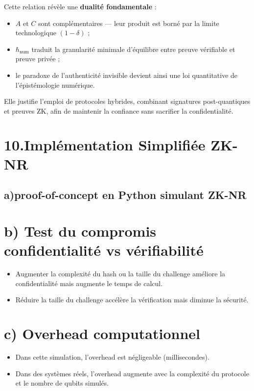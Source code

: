 \documentclass[12pt,a4paper]{report}
\begin{document}
{Cette relation révèle une \textbf{dualité fondamentale} :
\begin{itemize}
  \item $A$ et $C$ sont complémentaires — leur produit est borné par la limite technologique $(1-\delta)$ ;
  \item $\hbar_{\text{num}}$ traduit la granularité minimale d’équilibre entre preuve vérifiable et preuve privée ;
  \item le paradoxe de l’authenticité invisible devient ainsi une loi quantitative de l’épistémologie numérique.
\end{itemize}
Elle justifie l’emploi de protocoles hybrides, combinant signatures post-quantiques et preuves ZK, afin de maintenir la confiance sans sacrifier la confidentialité.


		
	    \section*{10.Implémentation Simplifiée ZK-NR}
		\subsection*{a)proof-of-concept en Python simulant ZK-NR}
	\section*{b) Test du compromis confidentialité vs vérifiabilité}
	\begin{itemize}
		\item Augmenter la complexité du hash ou la taille du challenge améliore la confidentialité mais augmente le temps de calcul.
		\item Réduire la taille du challenge accélère la vérification mais diminue la sécurité.
	\end{itemize}
	
	\section*{c) Overhead computationnel}
	\begin{itemize}
		\item Dans cette simulation, l'overhead est négligeable (millisecondes).
		\item Dans des systèmes réels, l'overhead augmente avec la complexité du protocole et le nombre de qubits simulés.
	\end{itemize}
}
\end{document}

